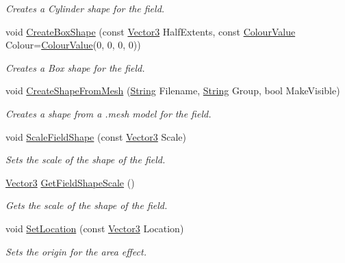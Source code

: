 \begin{DoxyCompactItemize}
\begin{DoxyCompactList}\small\item\em Creates a Cylinder shape for the field. \item\end{DoxyCompactList}\item 
void \hyperlink{classphys_1_1AreaEffect_a00ea72b91a4b70bc1e85f262332afb9a}{CreateBoxShape} (const \hyperlink{classphys_1_1Vector3}{Vector3} HalfExtents, const \hyperlink{classphys_1_1ColourValue}{ColourValue} Colour=\hyperlink{classphys_1_1ColourValue}{ColourValue}(0, 0, 0, 0))
\begin{DoxyCompactList}\small\item\em Creates a Box shape for the field. \item\end{DoxyCompactList}\item 
void \hyperlink{classphys_1_1AreaEffect_a129cfe777f13ea62727f684761778bcb}{CreateShapeFromMesh} (\hyperlink{namespacephys_aa03900411993de7fbfec4789bc1d392e}{String} Filename, \hyperlink{namespacephys_aa03900411993de7fbfec4789bc1d392e}{String} Group, bool MakeVisible)
\begin{DoxyCompactList}\small\item\em Creates a shape from a .mesh model for the field. \item\end{DoxyCompactList}\item 
void \hyperlink{classphys_1_1AreaEffect_a9407bf7416a804757d52127a3efae747}{ScaleFieldShape} (const \hyperlink{classphys_1_1Vector3}{Vector3} Scale)
\begin{DoxyCompactList}\small\item\em Sets the scale of the shape of the field. \item\end{DoxyCompactList}\item 
\hyperlink{classphys_1_1Vector3}{Vector3} \hyperlink{classphys_1_1AreaEffect_a251d82e373c6ada5b80c023434e513f6}{GetFieldShapeScale} ()
\begin{DoxyCompactList}\small\item\em Gets the scale of the shape of the field. \item\end{DoxyCompactList}\item 
void \hyperlink{classphys_1_1AreaEffect_a9332d4f1c5d1eaa23c6db5e9b95d746e}{SetLocation} (const \hyperlink{classphys_1_1Vector3}{Vector3} Location)
\begin{DoxyCompactList}\small\item\em Sets the origin for the area effect. \item\end{DoxyCompactList}\item 

\end{DoxyCompactItemize}
